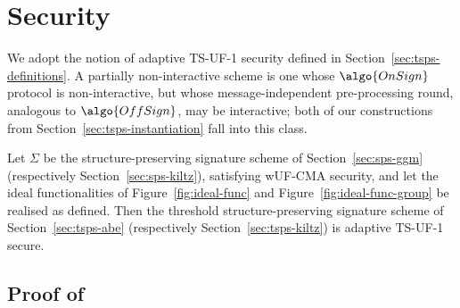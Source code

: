 \section{Security}\label{sec:tsps-security}

We adopt the notion of adaptive TS-UF-1 security defined in
Section~\ref{sec:tsps-definitions}. A partially non-interactive scheme is one
whose $\algo{OnSign}$ protocol is non-interactive, but whose
message-independent pre-processing round, analogous to $\algo{OffSign}$, may be
interactive; both of our constructions from
Section~\ref{sec:tsps-instantiation} fall into this class.

\begin{theorem}\label{thm:tsps-security}

  Let $\Sigma$ be the structure-preserving signature scheme of
  Section~\ref{sec:sps-ggm} (respectively Section~\ref{sec:sps-kiltz}),
  satisfying wUF-CMA security, and let the ideal functionalities of
  Figure~\ref{fig:ideal-func} and Figure~\ref{fig:ideal-func-group} be realised
  as defined. Then the threshold structure-preserving signature scheme of
  Section~\ref{sec:tsps-abe} (respectively Section~\ref{sec:tsps-kiltz}) is
  adaptive TS-UF-1 secure.

\end{theorem}

\subsection{Proof of~}\label{sec:tsps-security-proof}

